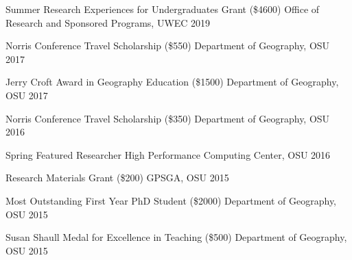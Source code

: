 
\begin{cvhonors}

  \cvhonor
  {Summer Research Experiences for Undergraduates Grant (\$4600)}
  {}
  {Office of Research and Sponsored Programs, UWEC}
  {2019}

  \cvhonor
    {Norris Conference Travel Scholarship (\$550)} %
    {} %
    {Department of Geography, OSU} %
    {2017} %

  \cvhonor
    {Jerry Croft Award in Geography Education (\$1500)} %
    {} %
    {Department of Geography, OSU} %
    {2017} %

  \cvhonor
    {Norris Conference Travel Scholarship (\$350)} %
    {} %
    {Department of Geography, OSU} %
    {2016} %

  \cvhonor
    {Spring Featured Researcher}%
    {} %
    {High Performance Computing Center, OSU} %
    {2016} %

  \cvhonor
    {Research Materials Grant (\$200)}%
    {} %
    {GPSGA, OSU} %
    {2015} %

  \cvhonor
    {Most Outstanding First Year PhD Student (\$2000)}%
    {} %
    {Department of Geography, OSU} %
    {2015} %

  \cvhonor
    {Susan Shaull Medal for Excellence in Teaching (\$500)}%
    {} %
    {Department of Geography, OSU} %
    {2015} %


\end{cvhonors}
